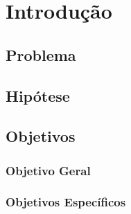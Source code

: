 \documentclass[a4paper,12pt,openany,oneside]{abntex2}
\begin{document}

\imprimircapa

\imprimirfolhaderosto

\listoffigures*
\cleardoublepage



\listoftables*
\cleardoublepage



\tableofcontents*
\cleardoublepage

\chapter{Introdução}




\section{Problema}




\section{Hipótese}




\section{Objetivos}
\subsection{Objetivo Geral}




\subsection{Objetivos Específicos}
\end{document}
